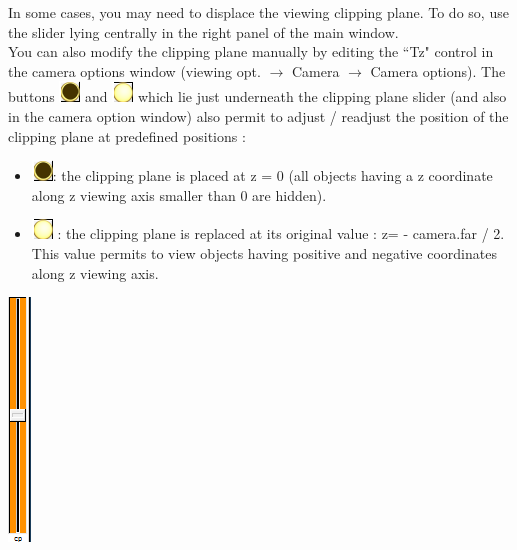 \begin{minipage}{0.7\textwidth}
In some cases, you may need to displace the viewing clipping plane. To do so, use
the slider lying centrally in the right panel of the main window.\\
You can also modify the clipping plane manually by editing the ``Tz" control in
the camera options window (viewing opt. $\rightarrow$ Camera $\rightarrow$ Camera options).
The buttons \includegraphics{images/Icons/clipping_plane3.png} and \includegraphics{images/Icons/clipping_plane2.png} which lie just underneath the clipping plane slider (and
also in the camera option window) also permit to adjust / readjust the position of
the clipping plane at predefined positions :
\begin{itemize}
\item  \includegraphics{images/Icons/clipping_plane3.png}: the clipping plane is placed at z = 0 (all objects having a z coordinate along
z viewing axis smaller than 0 are hidden).
\item	\includegraphics{images/Icons/clipping_plane2.png} : the clipping plane is replaced at its original value : z= - camera.far / 2. This value permits to
view objects having positive and negative coordinates along z viewing axis.

\end{itemize}
\end{minipage}    
\begin{minipage}{0.25\textwidth}\centering
  \includegraphics{images/Icons/clipping_plane.png}
 \end{minipage}   




